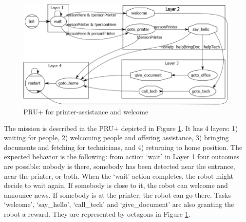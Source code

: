 \begin{figure}
\centering
\includegraphics[width=0.99\textwidth]{fig/pruDiag_U.png}
\caption{PRU+ for printer-assistance and welcome}
\label{fig:pru}
\end{figure}

The mission is described in the PRU+ depicted in Figure \ref{fig:pru}. It has 4 layers: 1) waiting for people, 2) welcoming people and offering assistance, 3) bringing documents and fetching for technicians, and 4) returning to home position.
The expected behavior is the following:
from action `wait' in Layer 1 four outcomes are possible: nobody is there, somebody has been detected near the entrance, near the printer, or both. When the `wait' action completes, the robot might decide to wait again. If somebody is close to it, the robot can welcome and announce news. If somebody is at the printer, the robot can go there.
Tasks `welcome', `say\_hello', `call\_tech' and `give\_document' are also granting the robot a reward. They are represented by octagons in Figure  \ref{fig:pru}.

%



